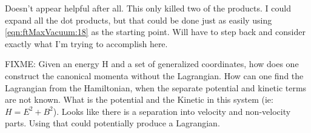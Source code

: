 Doesn't appear helpful after all.  This only killed two of the products.  I could expand all the dot products, but that could be done just as easily using \autoref{eqn:ftMaxVacuum:18} as the starting point.  Will have to step back and consider exactly what I'm trying to accomplish here.


FIXME: Given an energy H and a set of generalized coordinates, how does one construct the canonical momenta without the Lagrangian.  How can one find the Lagrangian from the Hamiltonian, when the separate potential and kinetic terms are not known.  What is the potential and the Kinetic in this system (ie: $H = E^2 + B^2$).  Looks like there is a separation into velocity and non-velocity parts.  Using that could potentially produce a Lagrangian.

\EndArticle
